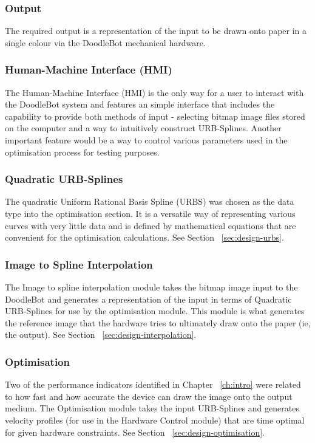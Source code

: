 	\subsubsection*{Output}
		The required output is a representation of the input to be drawn onto paper in a single colour via the DoodleBot mechanical hardware.
		
	\subsubsection*{Human-Machine Interface (HMI)} 
		The Human-Machine Interface (HMI) is the only way for a user to interact with the DoodleBot system and features an simple interface that includes the capability to provide both methods of input - selecting bitmap image files stored on the computer and a way to intuitively construct URB-Splines. Another important feature would be a way to control various parameters used in the optimisation process for testing purposes.
		
	\subsubsection*{Quadratic URB-Splines}
		The quadratic Uniform Rational Basis Spline (URBS) was chosen as the data type into the optimisation section. It is a versatile way of representing various curves with very little data and is defined by mathematical equations that are convenient for the optimisation calculations. See Section ~\ref{sec:design-urbs}.
		
	\subsubsection*{Image to Spline Interpolation}
		The Image to spline interpolation module takes the bitmap image input to the DoodleBot and generates a representation of the input in terms of Quadratic URB-Splines for use by the optimisation module. This module is what generates the reference image that the hardware tries to ultimately draw onto the paper (ie, the output). See Section ~\ref{sec:design-interpolation}.
		
	\subsubsection*{Optimisation}
		Two of the performance indicators identified in Chapter ~\ref{ch:intro} were related to how fast and how accurate the device can draw the image onto the output medium. The Optimisation module takes the input URB-Splines and generates velocity profiles (for use in the Hardware Control module) that are time optimal for given hardware constraints. See Section ~\ref{sec:design-optimisation}.

